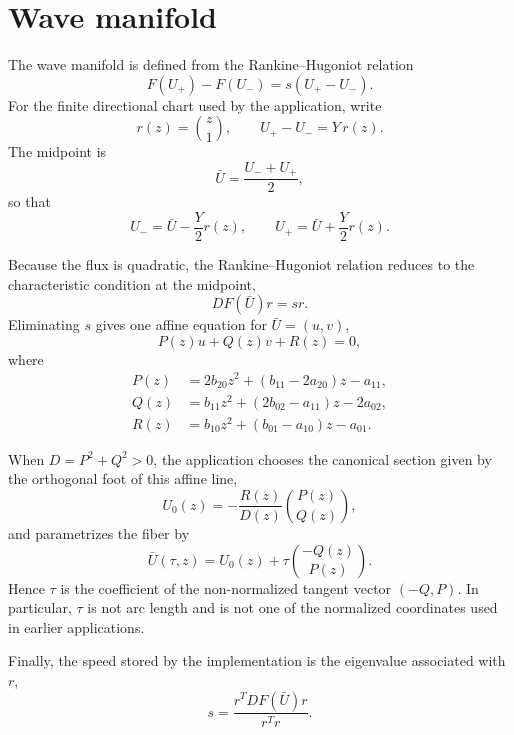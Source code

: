 \section{Wave manifold}

The wave manifold is defined from the Rankine--Hugoniot relation
\[
F(U_+)-F(U_-)=s(U_+-U_-).
\]
For the finite directional chart used by the application, write
\[
r(z)=\binom{z}{1},
\qquad
U_+-U_-=Y\,r(z).
\]
The midpoint is
\[
\bar U=\frac{U_-+U_+}{2},
\]
so that
\[
U_-=\bar U-\frac{Y}{2}r(z),
\qquad
U_+=\bar U+\frac{Y}{2}r(z).
\]

Because the flux is quadratic, the Rankine--Hugoniot relation reduces to the characteristic condition at the midpoint,
\[
DF(\bar U)r=s r.
\]
Eliminating $s$ gives one affine equation for $\bar U=(u,v)$,
\[
P(z)u+Q(z)v+R(z)=0,
\]
where
\begin{align*}
P(z)&=2b_{20}z^2+(b_{11}-2a_{20})z-a_{11},\\
Q(z)&=b_{11}z^2+(2b_{02}-a_{11})z-2a_{02},\\
R(z)&=b_{10}z^2+(b_{01}-a_{10})z-a_{01}.
\end{align*}

When $D=P^2+Q^2>0$, the application chooses the canonical section given by the orthogonal foot of this affine line,
\[
U_0(z)=-\frac{R(z)}{D(z)}\binom{P(z)}{Q(z)},
\]
and parametrizes the fiber by
\[
\boxed{\bar U(\tau,z)=U_0(z)+\tau\binom{-Q(z)}{P(z)}}.
\]
Hence $\tau$ is the coefficient of the non-normalized tangent vector $(-Q,P)$. In particular, $\tau$ is not arc length and is not one of the normalized coordinates used in earlier applications.

Finally, the speed stored by the implementation is the eigenvalue associated with $r$,
\[
s=\frac{r^{T}DF(\bar U)r}{r^{T}r}.
\]
